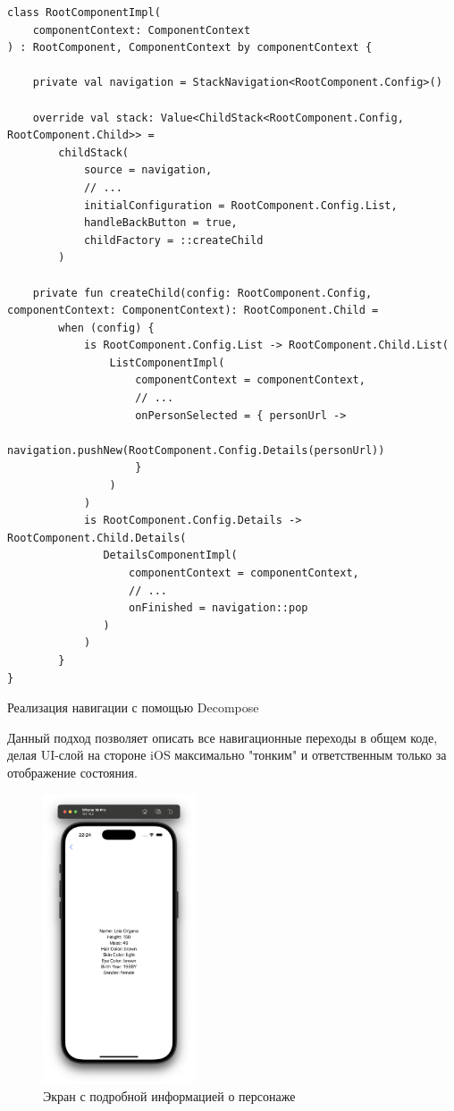 \documentclass[14pt, russian]{scrartcl}
\begin{document}
\begin{listing}[H]
\begin{verbatim}
class RootComponentImpl(
    componentContext: ComponentContext
) : RootComponent, ComponentContext by componentContext {

    private val navigation = StackNavigation<RootComponent.Config>()

    override val stack: Value<ChildStack<RootComponent.Config, RootComponent.Child>> =
        childStack(
            source = navigation,
            // ...
            initialConfiguration = RootComponent.Config.List,
            handleBackButton = true,
            childFactory = ::createChild
        )

    private fun createChild(config: RootComponent.Config, componentContext: ComponentContext): RootComponent.Child =
        when (config) {
            is RootComponent.Config.List -> RootComponent.Child.List(
                ListComponentImpl(
                    componentContext = componentContext,
                    // ...
                    onPersonSelected = { personUrl ->
                        navigation.pushNew(RootComponent.Config.Details(personUrl))
                    }
                )
            )
            is RootComponent.Config.Details -> RootComponent.Child.Details(
               DetailsComponentImpl(
                   componentContext = componentContext,
                   // ...
                   onFinished = navigation::pop
               )
            )
        }
}
\end{verbatim}
\caption{Реализация навигации с помощью Decompose}
\label{lst:kotlin_root_component}
\end{listing}

Данный подход позволяет описать все навигационные переходы в общем коде, делая UI-слой на стороне iOS максимально "тонким" и ответственным только за отображение состояния.


\begin{figure}[H]
    \centering
    \includegraphics[width=0.4\textwidth]{ios_details.png}
    \caption{Экран с подробной информацией о персонаже}
    \label{fig:details_screen}
\end{figure}
\end{document}
